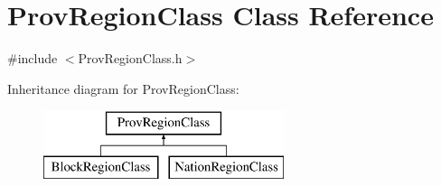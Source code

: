 \hypertarget{class_prov_region_class}{}\section{Prov\+Region\+Class Class Reference}
\label{class_prov_region_class}


{\ttfamily \#include $<$Prov\+Region\+Class.\+h$>$}

Inheritance diagram for Prov\+Region\+Class\+:\begin{figure}[H]
\begin{center}
\leavevmode
\includegraphics[height=2.000000cm]{class_prov_region_class}
\end{center}
\end{figure}
